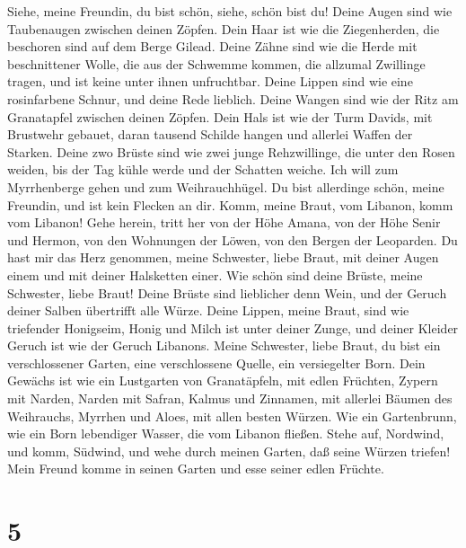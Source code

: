  Siehe, meine Freundin, du bist schön, siehe, schön bist du!
Deine Augen sind wie Taubenaugen zwischen deinen Zöpfen. Dein Haar ist
wie die Ziegenherden, die beschoren sind auf dem Berge Gilead.
 Deine Zähne sind wie die Herde mit beschnittener Wolle, die
aus der Schwemme kommen, die allzumal Zwillinge tragen, und ist keine
unter ihnen unfruchtbar.  Deine Lippen sind wie eine
rosinfarbene Schnur, und deine Rede lieblich. Deine Wangen sind wie der
Ritz am Granatapfel zwischen deinen Zöpfen.  Dein Hals ist
wie der Turm Davids, mit Brustwehr gebauet, daran tausend Schilde hangen
und allerlei Waffen der Starken.  Deine zwo Brüste sind wie
zwei junge Rehzwillinge, die unter den Rosen weiden,  bis
der Tag kühle werde und der Schatten weiche. Ich will zum Myrrhenberge
gehen und zum Weihrauchhügel.  Du bist allerdinge schön,
meine Freundin, und ist kein Flecken an dir.  Komm, meine
Braut, vom Libanon, komm vom Libanon! Gehe herein, tritt her von der
Höhe Amana, von der Höhe Senir und Hermon, von den Wohnungen der Löwen,
von den Bergen der Leoparden.  Du hast mir das Herz
genommen, meine Schwester, liebe Braut, mit deiner Augen einem und mit
deiner Halsketten einer.  Wie schön sind deine Brüste,
meine Schwester, liebe Braut! Deine Brüste sind lieblicher denn Wein,
und der Geruch deiner Salben übertrifft alle Würze.  Deine
Lippen, meine Braut, sind wie triefender Honigseim, Honig und Milch ist
unter deiner Zunge, und deiner Kleider Geruch ist wie der Geruch
Libanons.  Meine Schwester, liebe Braut, du bist ein
verschlossener Garten, eine verschlossene Quelle, ein versiegelter Born.
 Dein Gewächs ist wie ein Lustgarten von Granatäpfeln, mit
edlen Früchten, Zypern mit Narden,  Narden mit Safran,
Kalmus und Zinnamen, mit allerlei Bäumen des Weihrauchs, Myrrhen und
Aloes, mit allen besten Würzen.  Wie ein Gartenbrunn, wie
ein Born lebendiger Wasser, die vom Libanon fließen.  Stehe
auf, Nordwind, und komm, Südwind, und wehe durch meinen Garten, daß
seine Würzen triefen! Mein Freund komme in seinen Garten und esse seiner
edlen Früchte.

\hypertarget{section-4}{%
\section{5}\label{section-4}}

